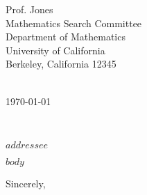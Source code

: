 \documentclass[11pt,a4paper]{letter} %
\def\opening#1{\thispagestyle{empty}
{\centering\fromaddress \vspace{0.6in} \\ %
\hspace*{\longindentation}\today\hspace*{\fill}\par} %
{\raggedright \toname \\ \toaddress \par} %
\vspace{0.4in} %
\noindent #1 %
}
\begin{document}

\begin{letter}
{Prof. Jones\\
Mathematics Search Committee\\
Department of Mathematics\\
University of California\\
Berkeley, California 12345\\
}


\opening{$addressee$}

$body$

\closing{Sincerely,}


\end{letter}
\end{document}
